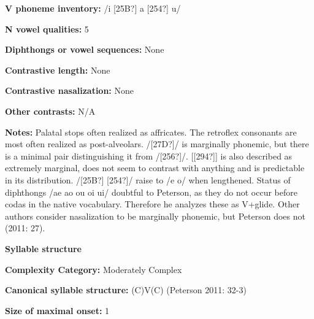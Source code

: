 \begin{styleBody}
\textbf{V phoneme inventory:} /i [25B?] a [254?] u/
\end{styleBody}

\begin{styleBody}
\textbf{N vowel qualities:} 5
\end{styleBody}

\begin{styleBody}
\textbf{Diphthongs or vowel sequences:} None
\end{styleBody}

\begin{styleBody}
\textbf{Contrastive length:} None
\end{styleBody}

\begin{styleBody}
\textbf{Contrastive nasalization:} None
\end{styleBody}

\begin{styleBody}
\textbf{Other contrasts:} N/A
\end{styleBody}

\begin{styleBody}
\textbf{Notes:} Palatal stops often realized as affricates. The retroflex consonants are most often realized as post-alveolars. /[27D?]/ is marginally phonemic, but there is a minimal pair distinguishing it from /[256?]/. [[294?]] is also described as extremely marginal, does not seem to contrast with anything and is predictable in its distribution. /[25B?] [254?]/ raise to /e o/ when lengthened. Status of diphthongs /ae ao ou oi ui/ doubtful to Peterson, as they do not occur before codas in the native vocabulary. Therefore he analyzes these as V+glide. Other authors consider nasalization to be marginally phonemic, but Peterson does not (2011: 27).
\end{styleBody}

\begin{styleBody}
\textbf{Syllable structure}
\end{styleBody}

\begin{styleBody}
\textbf{Complexity Category:} Moderately Complex
\end{styleBody}

\begin{styleBody}
\textbf{Canonical syllable structure:} (C)V(C)\textbf{ }(Peterson 2011: 32-3)
\end{styleBody}

\begin{styleBody}
\textbf{Size of maximal onset:} 1
\end{styleBody}

